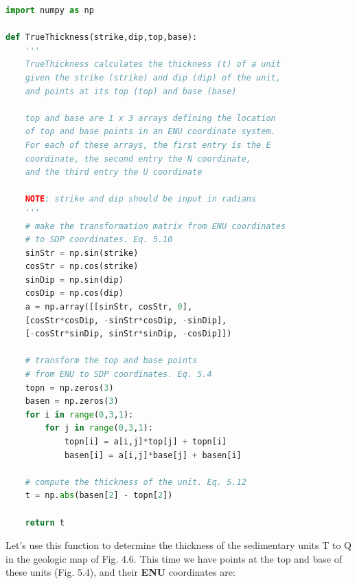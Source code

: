 \documentclass[a4paper , 12pt]{book}
\begin{document}
\begin{lstlisting}[language=Python, frame=single]
import numpy as np

def TrueThickness(strike,dip,top,base):
    '''
    TrueThickness calculates the thickness (t) of a unit 
    given the strike (strike) and dip (dip) of the unit, 
    and points at its top (top) and base (base) 

    top and base are 1 x 3 arrays defining the location 
    of top and base points in an ENU coordinate system. 
    For each of these arrays, the first entry is the E 
    coordinate, the second entry the N coordinate, 
    and the third entry the U coordinate

    NOTE: strike and dip should be input in radians
    '''
    # make the transformation matrix from ENU coordinates 
    # to SDP coordinates. Eq. 5.10
    sinStr = np.sin(strike)
    cosStr = np.cos(strike)
    sinDip = np.sin(dip)
    cosDip = np.cos(dip)
    a = np.array([[sinStr, cosStr, 0],
    [cosStr*cosDip, -sinStr*cosDip, -sinDip],
    [-cosStr*sinDip, sinStr*sinDip, -cosDip]])
    
    # transform the top and base points 
    # from ENU to SDP coordinates. Eq. 5.4 
    topn = np.zeros(3)
    basen = np.zeros(3)
    for i in range(0,3,1):
        for j in range(0,3,1):
            topn[i] = a[i,j]*top[j] + topn[i]
            basen[i] = a[i,j]*base[j] + basen[i]
    
    # compute the thickness of the unit. Eq. 5.12
    t = np.abs(basen[2] - topn[2])
    
    return t
\end{lstlisting}
 
Let's use this function to determine the thickness of the sedimentary units T to Q in the geologic map of Fig. 4.6. This time we have points at the top and base of these units (Fig. 5.4), and their \textbf{ENU} coordinates are:
\end{document}
